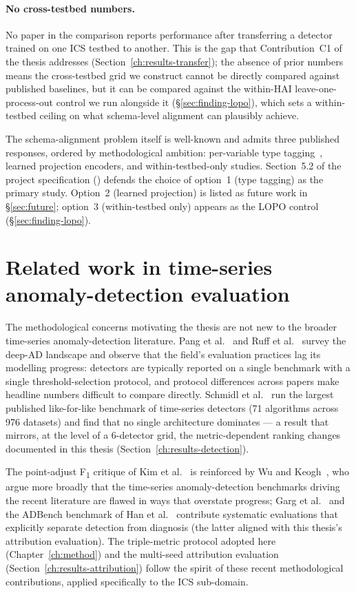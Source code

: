 \paragraph{No cross-testbed numbers.}  No paper in the comparison reports performance after transferring a detector trained on one ICS testbed to another.  This is the gap that Contribution~C1 of the thesis addresses (Section~\ref{ch:results-transfer}); the absence of prior numbers means the cross-testbed grid we construct cannot be directly compared against published baselines, but it can be compared against the within-HAI leave-one-process-out control we run alongside it (\S\ref{sec:finding-lopo}), which sets a within-testbed ceiling on what schema-level alignment can plausibly achieve.

The schema-alignment problem itself is well-known and admits three published responses, ordered by methodological ambition: per-variable type tagging~\cite{kravchik2018detecting}, learned projection encoders, and within-testbed-only studies.  Section~5.2 of the project specification () defends the choice of option~1 (type tagging) as the primary study.  Option~2 (learned projection) is listed as future work in \S\ref{sec:future}; option~3 (within-testbed only) appears as the LOPO control (\S\ref{sec:finding-lopo}).

\section{Related work in time-series anomaly-detection evaluation}
\label{sec:related-eval}

The methodological concerns motivating the thesis are not new to the broader time-series anomaly-detection literature.  Pang et al.~\cite{pang2021deep} and Ruff et al.~\cite{ruff2021unifying} survey the deep-AD landscape and observe that the field's evaluation practices lag its modelling progress: detectors are typically reported on a single benchmark with a single threshold-selection protocol, and protocol differences across papers make headline numbers difficult to compare directly.  Schmidl et al.~\cite{schmidl2022anomaly} run the largest published like-for-like benchmark of time-series detectors (71 algorithms across 976 datasets) and find that no single architecture dominates --- a result that mirrors, at the level of a 6-detector grid, the metric-dependent ranking changes documented in this thesis (Section~\ref{ch:results-detection}).

The point-adjust F\textsubscript{1} critique of Kim et al.~\cite{kim2022towards} is reinforced by Wu and Keogh~\cite{wu2022flawed}, who argue more broadly that the time-series anomaly-detection benchmarks driving the recent literature are flawed in ways that overstate progress; Garg et al.~\cite{garg2022evaluation} and the ADBench benchmark of Han et al.~\cite{han2022adbench} contribute systematic evaluations that explicitly separate detection from diagnosis (the latter aligned with this thesis's attribution evaluation).  The triple-metric protocol adopted here (Chapter~\ref{ch:method}) and the multi-seed attribution evaluation (Section~\ref{ch:results-attribution}) follow the spirit of these recent methodological contributions, applied specifically to the ICS sub-domain.

